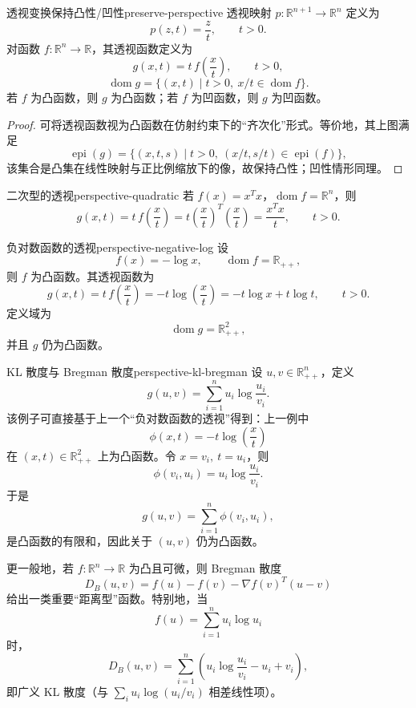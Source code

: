 \documentclass[11pt,a4paper]{article}
\begin{document}
\begin{theorem}{透视变换保持凸性/凹性}{preserve-perspective}
透视映射 $p:\mathbb{R}^{n+1}\to\mathbb{R}^n$ 定义为
\[
p(z,t)=\frac{z}{t},\qquad t>0.
\]
对函数 $f:\mathbb{R}^n\to\mathbb{R}$，其透视函数定义为
\[
g(x,t)=t\,f\!\left(\frac{x}{t}\right),\qquad t>0,
\]
\[
\operatorname{dom}g=\{(x,t)\mid t>0,\ x/t\in\operatorname{dom}f\}.
\]
若 $f$ 为凸函数，则 $g$ 为凸函数；若 $f$ 为凹函数，则 $g$ 为凹函数。
\end{theorem}

\begin{proof}
可将透视函数视为凸函数在仿射约束下的“齐次化”形式。等价地，其上图满足
\[
\operatorname{epi}(g)=\{(x,t,s)\mid t>0,\ (x/t,s/t)\in \operatorname{epi}(f)\},
\]
该集合是凸集在线性映射与正比例缩放下的像，故保持凸性；凹性情形同理。
\end{proof}

\begin{example}{二次型的透视}{perspective-quadratic}
若 $f(x)=x^Tx$，$\operatorname{dom}f=\mathbb{R}^n$，则
\[
g(x,t)=t\,f\!\left(\frac{x}{t}\right)
=t\left(\frac{x}{t}\right)^T\left(\frac{x}{t}\right)
=\frac{x^Tx}{t},\qquad t>0.
\]
\end{example}

\begin{example}{负对数函数的透视}{perspective-negative-log}
设
\[
f(x)=-\log x,\qquad \operatorname{dom}f=\mathbb{R}_{++},
\]
则 $f$ 为凸函数。其透视函数为
\[
g(x,t)=t\,f\!\left(\frac{x}{t}\right)
=-t\log\!\left(\frac{x}{t}\right)
=-t\log x+t\log t,\qquad t>0.
\]
定义域为
\[
\operatorname{dom}g=\mathbb{R}_{++}^2,
\]
并且 $g$ 仍为凸函数。
\end{example}

\begin{example}{KL 散度与 Bregman 散度}{perspective-kl-bregman}
设 $u,v\in\mathbb{R}_{++}^n$，定义
\[
g(u,v)=\sum_{i=1}^n u_i\log\frac{u_i}{v_i}.
\]
该例子可直接基于上一个“负对数函数的透视”得到：上一例中
\[
\phi(x,t)=-t\log\!\left(\frac{x}{t}\right)
\]
在 $(x,t)\in\mathbb{R}_{++}^2$ 上为凸函数。令 $x=v_i,\ t=u_i$，则
\[
\phi(v_i,u_i)=u_i\log\frac{u_i}{v_i}.
\]
于是
\[
g(u,v)=\sum_{i=1}^n \phi(v_i,u_i),
\]
是凸函数的有限和，因此关于 $(u,v)$ 仍为凸函数。

更一般地，若 $f:\mathbb{R}^n\to\mathbb{R}$ 为凸且可微，则 Bregman 散度
\[
D_B(u,v)=f(u)-f(v)-\nabla f(v)^T(u-v)
\]
给出一类重要“距离型”函数。特别地，当
\[
f(u)=\sum_{i=1}^n u_i\log u_i
\]
时，
\[
D_B(u,v)=\sum_{i=1}^n\!\left(u_i\log\frac{u_i}{v_i}-u_i+v_i\right),
\]
即广义 KL 散度（与 $\sum_i u_i\log(u_i/v_i)$ 相差线性项）。
\end{example}
\end{document}
